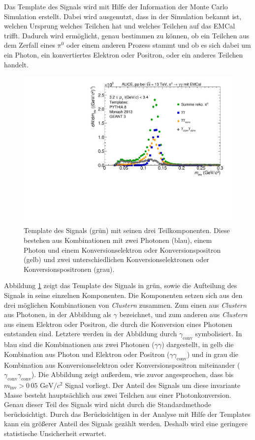 Das Template des Signals wird mit Hilfe der Information der Monte Carlo Simulation erstellt.
Dabei wird ausgenutzt, dass in der Simulation bekannt ist, welchen Ursprung welches Teilchen hat und welches Teilchen auf das EMCal trifft.
Dadurch wird ermöglicht, genau bestimmen zu können, ob ein Teilchen aus dem Zerfall eines $\pi^{0}$ oder einem anderen Prozess stammt und ob es sich dabei um ein Photon, ein konvertiertes Elektron oder Positron, oder ein anderes Teilchen handelt.
\begin{figure}[tp]
\centering
\includegraphics[width=.75\linewidth]{PeakTemplateMotivation10_Data_2016.pdf}
\caption{Template des Signals (grün) mit seinen drei Teilkomponenten.
Diese bestehen aus Kombinationen mit zwei Photonen (blau), einem Photon und einem Konversionselektron oder Konversionspositron (gelb) und zwei unterschiedlichen Konversionselektronen oder Konversionspositronen (grau).}
\label{fig:SigTemp}
\end{figure}
\newline
Abbildung \ref{fig:SigTemp} zeigt das Template des Signals in grün, sowie die Aufteilung des Signals in seine einzelnen Komponenten.
Die Komponenten setzen sich aus den drei möglichen Kombinationen von \textit{Clustern} zusammen.
Zum einen aus \textit{Clustern} aus Photonen, in der Abbildung als $\gamma$ bezeichnet, und zum anderen aus \textit{Clustern} aus einem Elektron oder Positron, die durch die Konversion  eines Photonen entstanden sind.
Letztere werden in der Abbildung durch $\gamma_\text{conv}$ symbolisiert.
\newline
In blau sind die Kombinationen aus zwei Photonen ($\gamma\gamma$) dargestellt, in gelb die Kombination aus Photon und Elektron oder Positron ($\gamma\gamma_\text{conv}$) und in grau die Kombination aus Konversionselektron oder Konversionspositron miteinander ($\gamma_\text{conv}\gamma_\text{conv}$).
\newline
Die Abbildung zeigt außerdem, wie zuvor angesprochen, dass bis $m_\text{inv}>0\,05 \text{ GeV}/c^{2}$ Signal vorliegt.
Der Anteil des Signals um diese invariante Masse besteht hauptsächlich aus zwei Teilchen aus einer Photonkonversion.
Genau dieser Teil des Signals wird nicht durch die Standardmethode berücksichtigt.
Durch das Berücksichtigen in der Analyse mit Hilfe der Templates kann ein größerer Anteil des Signals gezählt werden.
Deshalb wird eine geringere statistische Unsicherheit erwartet.